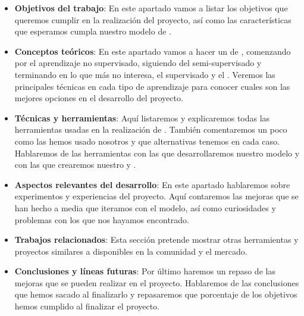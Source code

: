 \begin{itemize}
  \item \textbf{Objetivos del trabajo}: En este apartado vamos a listar los objetivos que queremos cumplir en la realización del proyecto, así como las características que esperamos cumpla nuestro modelo de .
  \item \textbf{Conceptos teóricos}: En este apartado vamos a hacer un  de , comenzando por el aprendizaje no supervisado, siguiendo del semi-supervisado y terminando en lo que más no interesa, el supervisado y el . Veremos las principales técnicas en cada tipo de aprendizaje para conocer cuales son las mejores opciones en el desarrollo del proyecto.
  \item \textbf{Técnicas y herramientas}: Aquí listaremos y explicaremos todas las herramientas usadas en la realización de . También comentaremos un poco como las hemos usado nosotros y que alternativas tenemos en cada caso. Hablaremos de las herramientas con las que desarrollaremos nuestro modelo y con las que crearemos nuestro  y .
  \item \textbf{Aspectos relevantes del desarrollo}: En este apartado hablaremos sobre experimentos y experiencias del proyecto. Aquí contaremos las mejoras que se han hecho a media que iteramos con el modelo, así como curiosidades y problemas con los que nos hayamos encontrado.
  \item \textbf{Trabajos relacionados}: Esta sección pretende mostrar otras herramientas y proyectos similares a  disponibles en la comunidad y el mercado.
  \item \textbf{Conclusiones y líneas futuras}: Por último haremos un repaso de las mejoras que se pueden realizar en el proyecto. Hablaremos de las conclusiones que hemos sacado al finalizarlo y repasaremos que porcentaje de los objetivos hemos cumplido al finalizar el proyecto.
\end{itemize}